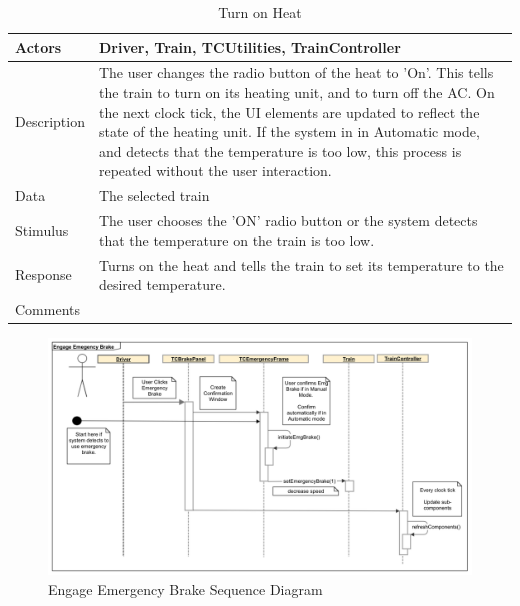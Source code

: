 \documentclass[]{article}
\begin{document}
\begin{table}[H]
	\centering
	\caption{Turn on Heat}
	\begin{tabular}{|l|l|}
		\hline
		Actors & \parbox[t]{10cm}{Driver, Train, TCUtilities, TrainController} \\ \hline
		Description & \parbox[t]{10cm}{The user changes the radio button of the heat to 'On'. This tells the train to turn on its heating unit, and to turn off the AC.  On the next clock tick, the UI elements are updated to reflect the state of the heating unit. If the system in in Automatic mode, and detects that the temperature is too low, this process is repeated without the user interaction.} \\ \hline
		Data &  \parbox[t]{10cm}{The selected train} \\ \hline
		Stimulus &  \parbox[t]{10cm}{ The user chooses the 'ON' radio button or the system detects that the temperature on the train is too low. } \\ \hline
		Response & \parbox[t]{10cm}{Turns on the heat and tells the train to set its temperature to the desired temperature.}\\ \hline
		Comments & \parbox[t]{10cm}{}  \\ \hline
	\end{tabular}
\end{table}

\begin{figure}[H]
	\centering
	\includegraphics[width=\textwidth]{tc_emgBrake_usecase}
	\caption{Engage Emergency Brake Sequence Diagram}
\end{figure}
\end{document}
